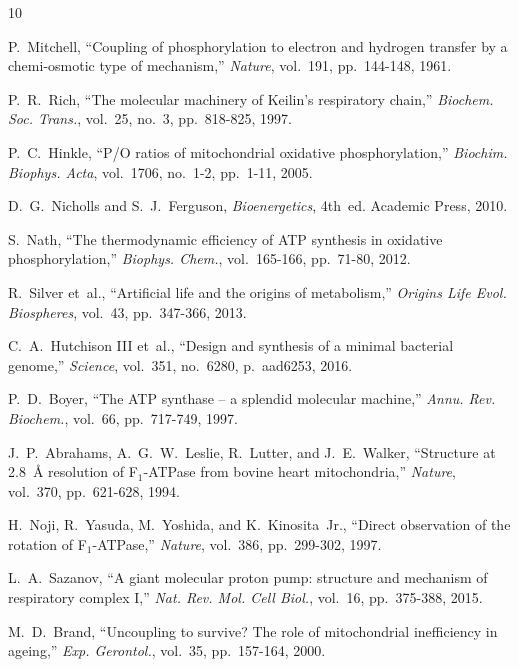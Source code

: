 \documentclass[12pt]{article}
\begin{document}
\begin{thebibliography}{10}

P.~Mitchell, ``Coupling of phosphorylation to electron and hydrogen transfer by a chemi-osmotic type of mechanism,'' \textit{Nature}, vol.~191, pp.~144-148, 1961.

P.~R.~Rich, ``The molecular machinery of Keilin's respiratory chain,'' \textit{Biochem. Soc. Trans.}, vol.~25, no.~3, pp.~818-825, 1997.

P.~C.~Hinkle, ``P/O ratios of mitochondrial oxidative phosphorylation,'' \textit{Biochim. Biophys. Acta}, vol.~1706, no.~1-2, pp.~1-11, 2005.

D.~G.~Nicholls and S.~J.~Ferguson, \textit{Bioenergetics}, 4th~ed. Academic Press, 2010.

S.~Nath, ``The thermodynamic efficiency of ATP synthesis in oxidative phosphorylation,'' \textit{Biophys. Chem.}, vol.~165-166, pp.~71-80, 2012.

R.~Silver et~al., ``Artificial life and the origins of metabolism,'' \textit{Origins Life Evol. Biospheres}, vol.~43, pp.~347-366, 2013.

C.~A.~Hutchison III et~al., ``Design and synthesis of a minimal bacterial genome,'' \textit{Science}, vol.~351, no.~6280, p.~aad6253, 2016.

P.~D.~Boyer, ``The ATP synthase -- a splendid molecular machine,'' \textit{Annu. Rev. Biochem.}, vol.~66, pp.~717-749, 1997.

J.~P.~Abrahams, A.~G.~W.~Leslie, R.~Lutter, and J.~E.~Walker, ``Structure at 2.8~\AA{} resolution of F$_1$-ATPase from bovine heart mitochondria,'' \textit{Nature}, vol.~370, pp.~621-628, 1994.

H.~Noji, R.~Yasuda, M.~Yoshida, and K.~Kinosita~Jr., ``Direct observation of the rotation of F$_1$-ATPase,'' \textit{Nature}, vol.~386, pp.~299-302, 1997.

L.~A.~Sazanov, ``A giant molecular proton pump: structure and mechanism of respiratory complex I,'' \textit{Nat. Rev. Mol. Cell Biol.}, vol.~16, pp.~375-388, 2015.

M.~D.~Brand, ``Uncoupling to survive? The role of mitochondrial inefficiency in ageing,'' \textit{Exp. Gerontol.}, vol.~35, pp.~157-164, 2000.

\end{thebibliography}
\end{document}
